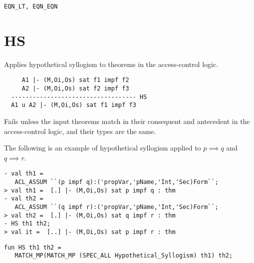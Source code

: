 \texttt{EQN\_LT, EQN\_EQN}
\ENDDOC

\section{HS}



\egroup

\SYNOPSIS
Applies hypothetical syllogism to theorems in the access-control logic.

\DESCRIBE
\begin{verbatim}
     A1 |- (M,Oi,Os) sat f1 impf f2
     A2 |- (M,Oi,Os) sat f2 impf f3
  ----------------------------------- HS
  A1 u A2 |- (M,Oi,Os) sat f1 impf f3
\end{verbatim}

\FAILURE 
Fails unless the input theorems match in their consequent and
antecedent in the access-control logic, and their types are the same.

\EXAMPLE
The following is an example of hypothetical syllogism applied to $p
\implies q$ and $q \implies r$.
\begin{holboxed}
\begin{verbatim}
- val th1 = 
   ACL_ASSUM ``(p impf q):('propVar,'pName,'Int,'Sec)Form``;
> val th1 =  [.] |- (M,Oi,Os) sat p impf q : thm
- val th2 = 
   ACL_ASSUM ``(q impf r):('propVar,'pName,'Int,'Sec)Form``;
> val th2 =  [.] |- (M,Oi,Os) sat q impf r : thm
- HS th1 th2;
> val it =  [..] |- (M,Oi,Os) sat p impf r : thm
\end{verbatim}

\end{holboxed}
\IMPLEMENTATION
\begin{holboxed}
\begin{verbatim}
fun HS th1 th2 = 
   MATCH_MP(MATCH_MP (SPEC_ALL Hypothetical_Syllogism) th1) th2;
\end{verbatim}
\end{holboxed}


